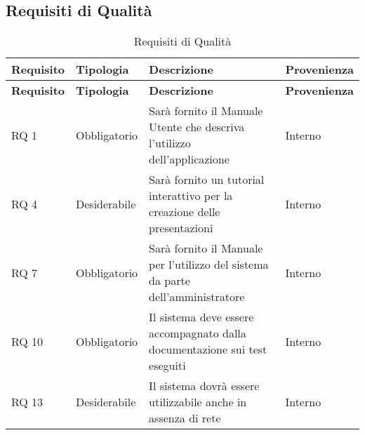 \subsection{Requisiti di Qualità}{ 
\renewcommand*{\arraystretch}{1.4} 
\begin{longtable} [c]{| p{2.5cm} | p{2.5cm} | p{6cm} |p{2.5cm}|} 
\caption{Requisiti di Qualità \label{tab:reqQualita}}\\ \hline\textbf{Requisito} & \textbf{Tipologia} & \textbf{Descrizione} & \textbf{Provenienza} \\ 
\hline \endfirsthead \hline 
\textbf{Requisito} & \textbf{Tipologia} & \textbf{Descrizione} & \textbf{Provenienza} \\ 
\hline \endhead \hline \endfoot \hline \endlastfoot 
RQ 1 & Obbligatorio & Sarà fornito il Manuale Utente che descriva l'utilizzo dell'applicazione & Interno\\ 
 \hline 
RQ 4 & Desiderabile & Sarà fornito un tutorial interattivo per la creazione delle presentazioni & Interno\\ 
 \hline 
RQ 7 & Obbligatorio & Sarà fornito il Manuale per l'utilizzo del sistema da parte dell'amministratore & Interno\\ 
 \hline 
RQ 10 & Obbligatorio & Il sistema deve essere accompagnato dalla documentazione sui test eseguiti & Interno\\ 
 \hline 
RQ 13 & Desiderabile & Il sistema dovrà essere utilizzabile anche in assenza di rete & Interno\\ 
 \hline 
\end{longtable}}